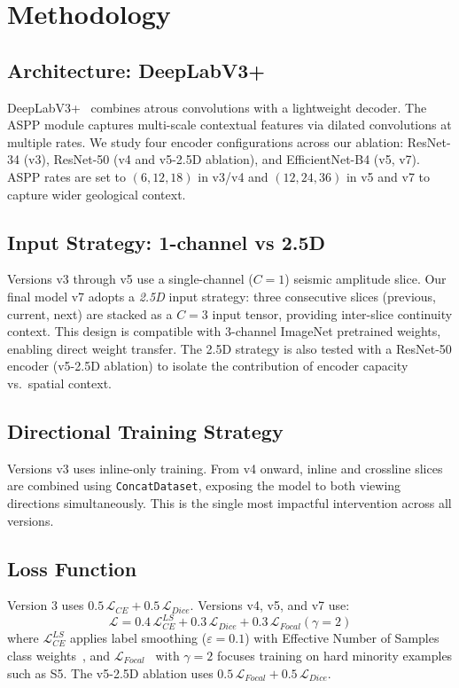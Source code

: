 \documentclass[journal]{IEEEtran}
\begin{document}
\section{Methodology}
\label{sec:method}

\subsection{Architecture: DeepLabV3+}

DeepLabV3+~\cite{chen2018} combines atrous convolutions with a lightweight decoder. The ASPP module captures multi-scale contextual features via dilated convolutions at multiple rates. We study four encoder configurations across our ablation: ResNet-34 (v3), ResNet-50 (v4 and v5-2.5D ablation), and EfficientNet-B4 (v5, v7). ASPP rates are set to $(6, 12, 18)$ in v3/v4 and $(12, 24, 36)$ in v5 and v7 to capture wider geological context.

\subsection{Input Strategy: 1-channel vs 2.5D}

Versions v3 through v5 use a single-channel ($C=1$) seismic amplitude slice. Our final model v7 adopts a \emph{2.5D} input strategy: three consecutive slices (previous, current, next) are stacked as a $C=3$ input tensor, providing inter-slice continuity context. This design is compatible with 3-channel ImageNet pretrained weights, enabling direct weight transfer. The 2.5D strategy is also tested with a ResNet-50 encoder (v5-2.5D ablation) to isolate the contribution of encoder capacity vs.\ spatial context.

\subsection{Directional Training Strategy}

Versions v3 uses inline-only training. From v4 onward, inline and crossline slices are combined using \texttt{ConcatDataset}, exposing the model to both viewing directions simultaneously. This is the single most impactful intervention across all versions.

\subsection{Loss Function}

Version 3 uses $0.5\,\mathcal{L}_{CE} + 0.5\,\mathcal{L}_{Dice}$. Versions v4, v5, and v7 use:
\begin{equation}
\mathcal{L} = 0.4\,\mathcal{L}_{CE}^{LS} + 0.3\,\mathcal{L}_{Dice} + 0.3\,\mathcal{L}_{Focal}(\gamma{=}2)
\end{equation}
where $\mathcal{L}_{CE}^{LS}$ applies label smoothing ($\varepsilon=0.1$) with Effective Number of Samples class weights~\cite{cui2019}, and $\mathcal{L}_{Focal}$~\cite{lin2017} with $\gamma=2$ focuses training on hard minority examples such as S5. The v5-2.5D ablation uses $0.5\,\mathcal{L}_{Focal} + 0.5\,\mathcal{L}_{Dice}$.
\end{document}
